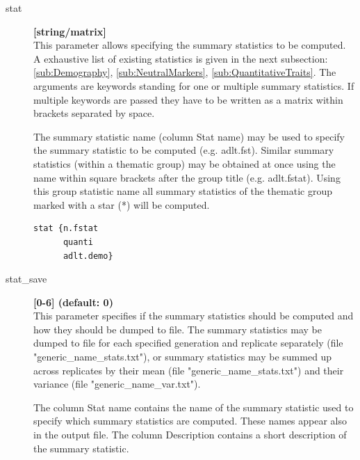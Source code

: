 \documentclass[letterpaper,12pt,oneside]{book}
\begin{document}
\begin{description}
\item[stat] \textbf{[string/matrix]}\\
This parameter allows specifying the summary statistics to be computed.  A exhaustive list of  existing statistics is given in the next subsection: \ref{sub:Demography}, \ref{sub:NeutralMarkers}, \ref{sub:QuantitativeTraits}. The arguments are keywords standing for one or multiple summary statistics. If multiple keywords are passed they have to be written as a matrix within brackets separated by space. 

The summary statistic name (column \textsf{Stat name}) may be used to specify the summary statistic to be computed (e.g. \textsf{adlt.fst}). Similar summary statistics (within a thematic group) may be obtained at once using the name within square brackets after the group title (e.g. \textsf{adlt.fstat}). Using this group statistic name all summary statistics of the thematic group marked with a star (*) will be computed. 
\begin{lstlisting}[frame=single]
stat {n.fstat 
      quanti 
      adlt.demo}
\end{lstlisting}

\item[stat\_save] \textbf{[0-6] (default: 0)}\\
This parameter specifies if the summary statistics should be computed and how they should be dumped to file. The summary statistics may be dumped to file for each specified generation and replicate separately (file "generic\_name\_stats.txt"), or summary statistics may be summed up across replicates by their mean (file "generic\_name\_stats.txt") and their variance (file "generic\_name\_var.txt").

The column \textsf{Stat name} contains the name of the summary statistic used to specify which summary statistics are computed. These names appear also in the output file. The column \textsf{Description} contains a short description of the summary statistic. 



\begin{description}


\end{description}
\end{description}
\end{document}

